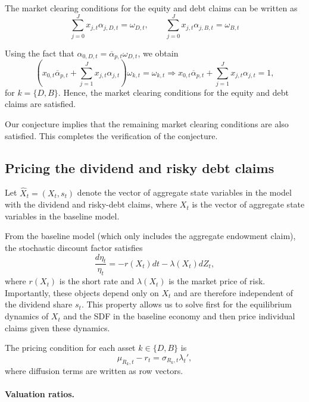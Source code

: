 \documentclass[11pt,english]{article}
\begin{document}
The market clearing conditions for the equity and debt claims can be written as
\begin{equation}
	\sum_{j=0}^J x_{j,t} \alpha_{j,D,t} = \omega_{D,t}, 
	\qquad 
	\sum_{j=0}^J x_{j,t} \alpha_{j,B,t} = \omega_{B,t}
\end{equation}

Using the fact that $\alpha_{0,D,t} = \overline{\alpha}_{p,t} \omega_{D,t}$, we obtain
\begin{equation}
	\left(x_{0,t}\overline{\alpha}_{p,t} + \sum_{j=1}^J x_{j,t} \alpha_{j,t}\right) \omega_{k,t} = \omega_{k,t} \Rightarrow x_{0,t}\overline{\alpha}_{p,t} + \sum_{j=1}^J x_{j,t} \alpha_{j,t} = 1,
\end{equation}
for $k = \{D, B\}$. Hence, the market clearing conditions for the equity and debt claims are satisfied.

Our conjecture implies that the remaining market clearing conditions are also satisfied.
This completes the verification of the conjecture.

\subsection{Pricing the dividend and risky debt claims}

Let $\hat X_t = (X_t,s_t)$ denote the vector of aggregate state variables in the model with the dividend and risky-debt claims, where $X_t$ is the vector of aggregate state variables in the baseline model.

From the baseline model (which only includes the aggregate endowment claim), the stochastic discount factor satisfies
\begin{equation}
\frac{d\eta_t}{\eta_t} = -r(X_t)dt - \lambda(X_t)dZ_t,
\end{equation}
where $r(X_t)$ is the short rate and $\lambda(X_t)$ is the market price of risk. Importantly, these objects depend only on $X_t$ and are therefore independent of the dividend share $s_t$. This property allows us to solve first for the equilibrium dynamics of $X_t$ and the SDF in the baseline economy and then price individual claims given these dynamics.

The pricing condition for each asset $k \in \{D,B\}$ is
\begin{equation}
\mu_{R_k,t} - r_t = \sigma_{R_k,t}\lambda_t',
\end{equation}
where diffusion terms are written as row vectors.

\paragraph{Valuation ratios.}
\end{document}
